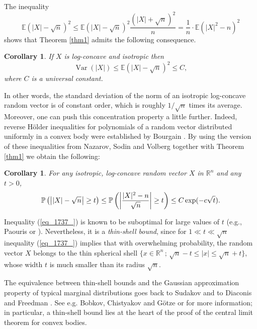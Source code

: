 \documentclass[12pt,a4paper]{article}
\newcommand{\E}{\mathbb{E}}
\newcommand{\EE}{\mathbb{E}}
\newcommand{\PP}{\mathbb{P}}
\newcommand{\RR}{\mathbb{R}}
\newcommand{\var}{\mathop{\mathrm{Var}}\nolimits}
\newtheorem{corollary}[theorem]{Corollary}
\theoremstyle{definition}
\begin{document}
The inequality
$$ \EE \left( |X| - \sqrt{n} \right)^2 \leq \EE \left( |X| - \sqrt{n} \right)^2 \frac{\left( |X| + \sqrt{n} \right)^2}{n}
= \frac{1}{n} \cdot \EE (|X|^2 - n)^2  $$
shows that Theorem \ref{thm1} admits the following consequence. 
\begin{corollary} \label{cor_zzz}
If $X$ is log-concave and isotropic then 
\begin{equation}\label{abs}
\var ( \vert X\vert ) \leq \E ( \vert X\vert - \sqrt n)^2 \leq C , 
\end{equation} 
where $C$ is a universal constant. 
\end{corollary} 
In other words, the standard deviation of the norm of an isotropic 
log-concave random vector is of constant order, which is roughly 
$1/\sqrt n$ times its average. 
Moreover, one can push this concentration property a little 
further. Indeed, reverse H\"older inequalities for polynomials of a random vector distributed uniformly in a convex body were established by Bourgain \cite{bourgain}.
By using the version of these inequalities from Nazarov, Sodin and Volberg \cite{nsv} together with Theorem \ref{thm1} we obtain the following: 
\begin{corollary}  
For any isotropic, log-concave random vector $X$ in $\RR^n$ and any $t > 0$,
\begin{equation}
\PP \left( \big| \hspace{0.3pt} |X| - \sqrt{n}  \hspace{0.5pt} \big| \geq t \right) \leq \PP \left( \left| \frac{|X|^2 - n}{\sqrt{n}} \right| \geq t \right) \leq C \exp(-c \sqrt{t}).
\label{eq_1737_}
\end{equation}
\end{corollary}
Inequality (\ref{eq_1737_}) is known to be suboptimal for large values of $t$
(e.g., Paouris \cite{paouris} or \cite[Section 8.2]{KLbull}). Nevertheless,  it is a {\it thin-shell bound}, since for $1 \ll t \ll \sqrt{n}$ inequality (\ref{eq_1737_}) implies that
with overwhelming probability, the random vector $X$ belongs to the thin spherical shell $\{ x \in \RR^n \, ; \, \sqrt{n} -t \leq |x| \leq \sqrt{n} + t\}$, whose width $t$ is much smaller than its radius $\sqrt{n}$.

\medskip
The equivalence between thin-shell bounds and the Gaussian approximation property
of typical marginal distributions goes back to Sudakov \cite{sudakov} and to Diaconis and Freedman \cite{diaconis_freedman}.
See e.g. Bobkov, Chistyakov and G\"otze \cite{BCG1}
or \cite{K_euro} for more information; in particular, a thin-shell bound lies at the heart
of the proof of the central limit theorem for convex bodies.
\end{document}
